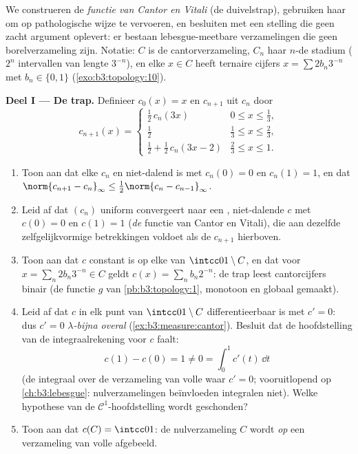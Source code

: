 \begin{problem}
\label{pb:b3:measure:1}
We construeren de \emph{functie van Cantor en Vitali} (de
duivelstrap), gebruiken haar om  op pathologische wijze te
vervoeren, en besluiten met een stelling die geen zacht argument
oplevert: er bestaan lebesgue-meetbare verzamelingen die geen
borelverzameling zijn. Notatie: $C$ is de cantorverzameling,
$C_n$ haar $n$-de stadium ($2^n$ intervallen van lengte $3^{-n}$),
en elke $x \in C$ heeft ternaire cijfers $x = \sum 2b_n3^{-n}$ met
$b_n \in \{0,1\}$ (\cref{exo:b3:topology:10}).

\medskip
\noindent\textbf{Deel I --- De trap.} Definieer $c_0(x) = x$ en
$c_{n+1}$ uit $c_n$ door
\[
c_{n+1}(x) = \begin{cases}
\tfrac12\,c_n(3x) & 0 \leq x \leq \tfrac13,\\[2pt]
\tfrac12 & \tfrac13 \leq x \leq \tfrac23,\\[2pt]
\tfrac12 + \tfrac12\,c_n(3x - 2) & \tfrac23 \leq x \leq 1.
\end{cases}
\]
\begin{enumerate}
  \item Toon aan dat elke $c_n$  en niet-dalend is met
        $c_n(0) = 0$ en $c_n(1) = 1$, en dat $\norm{c_{n+1} -
        c_n}_\infty \leq \tfrac12\norm{c_n - c_{n-1}}_\infty$.
  \item Leid af dat $(c_n)$ uniform convergeert naar een ,
        niet-dalende $c$ met $c(0) = 0$ en $c(1) = 1$ (\emph{de}
        functie van Cantor en Vitali), die aan dezelfde
        zelfgelijkvormige betrekkingen voldoet als de $c_{n+1}$
        hierboven.
  \item Toon aan dat $c$ constant is op elke 
        van $\intcc01\setminus C$, en dat voor $x = \sum_n
        2b_n3^{-n} \in C$ geldt $c(x) = \sum_n b_n2^{-n}$: de trap
        leest cantorcijfers binair (de functie $g$ van
        \cref{pb:b3:topology:1}, monotoon en globaal gemaakt).
  \item Leid af dat $c$ in elk punt van $\intcc01\setminus C$
        differentieerbaar is met $c' = 0$: dus $c' = 0$
        \emph{$\lambda$-bijna overal}
        (\cref{ex:b3:measure:cantor}). Besluit dat de
        hoofdstelling van de integraalrekening voor $c$ faalt:
        \[
        c(1) - c(0) = 1 \neq 0 = \int_0^1 c'(t)\,\dd t
        \]
        (de integraal over de verzameling van volle  waar $c'
        = 0$; vooruitlopend op \cref{ch:b3:lebesgue}:
        nulverzamelingen beïnvloeden integralen niet). Welke
        hypothese van de $\mathcal C^1$-hoofdstelling wordt
        geschonden?
  \item Toon aan dat $c(C) = \intcc01$: de nulverzameling $C$
        wordt \emph{op} een verzameling van volle  afgebeeld.
\end{enumerate}


\end{problem}
